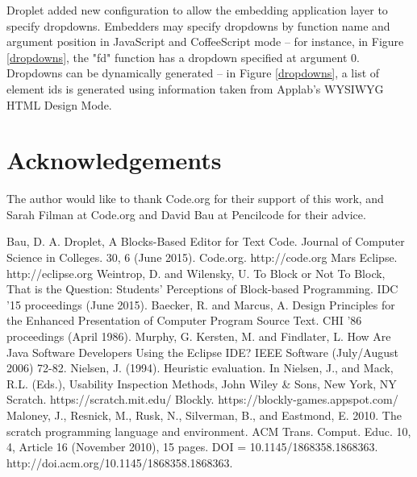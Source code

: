\documentclass[conference]{IEEEtran}
\begin{document}
Droplet added new configuration to allow the embedding application layer to specify dropdowns. Embedders may specify dropdowns by function name and argument position in JavaScript and CoffeeScript mode -- for instance, in Figure \ref{dropdowns}, the "fd" function has a dropdown specified at argument 0. Dropdowns can be dynamically generated -- in Figure \ref{dropdowns}, a list of element ids is generated using information taken from Applab's WYSIWYG HTML Design Mode.

\section{Acknowledgements}

The author would like to thank Code.org for their support of this work, and Sarah Filman at Code.org and David Bau at Pencilcode for their advice.
\vfill

\begin{thebibliography}{1}

  Bau, D. A. Droplet, A Blocks-Based Editor for Text Code. Journal of Computer Science in Colleges. 30, 6 (June 2015).
  Code.org. http://code.org
  Mars Eclipse. http://eclipse.org
  Weintrop, D. and Wilensky, U. To Block or Not To Block, That is the Question: Students' Perceptions of Block-based Programming. IDC '15 proceedings (June 2015).
  Baecker, R. and Marcus, A. Design Principles for the Enhanced Presentation of Computer Program Source Text. CHI '86 proceedings (April 1986).
  Murphy, G. Kersten, M. and Findlater, L. How Are Java Software Developers Using the Eclipse IDE? IEEE Software (July/August 2006) 72-82.
  Nielsen, J. (1994). Heuristic evaluation. In Nielsen, J., and Mack, R.L. (Eds.), Usability Inspection Methods, John Wiley \& Sons, New York, NY
  Scratch. https://scratch.mit.edu/
  Blockly. https://blockly-games.appspot.com/
  Maloney, J., Resnick, M., Rusk, N., Silverman, B., and Eastmond, E. 2010. The scratch programming language and environment. ACM Trans. Comput. Educ. 10, 4, Article 16 (November 2010), 15 pages. DOI = 10.1145/1868358.1868363. http://doi.acm.org/10.1145/1868358.1868363.

\end{thebibliography}

\end{document}
